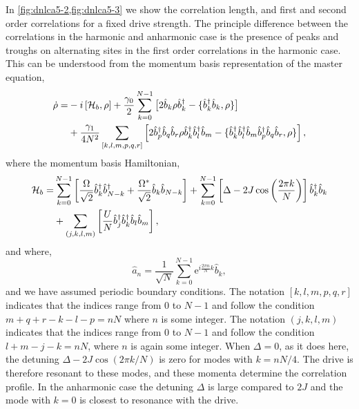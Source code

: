 In \cref{fig:dnlca5-2,fig:dnlca5-3} we show the correlation length, and first and second order correlations for a fixed drive strength. The principle difference between the correlations in the harmonic and anharmonic case is the presence of peaks and troughs on alternating sites in the first order correlations in the harmonic case. This can be understood from the momentum basis representation of the master equation,
\begin{align}
	\dot{\rho} = &-i\left[\mathcal{H}_{b}, \rho\right] + \frac{\gamma_{0}}{2}\sum_{k=0}^{N-1}\big[2\hat{b}_{k}\rho\hat{b}_{k}^{\dagger} - \{\hat{b}_{k}^{\dagger}\hat{b}_{k}, \rho\}\big] \notag \\
	&+ \frac{\gamma_{1}}{4N^{2}} \sum_{[k,l,m,p,q,r]} \left[ 2\hat{b}_{p}^{\dagger}\hat{b}_{q}\hat{b}_{r}\rho\hat{b}_{k}^{\dagger}\hat{b}_{l}^{\dagger}\hat{b}_{m} - \{\hat{b}_{k}^{\dagger}\hat{b}_{l}^{\dagger}\hat{b}_{m}\hat{b}_{p}^{\dagger}\hat{b}_{q}\hat{b}_{r}, \rho\} \right],
	\label{eq:dnlca5-3}
\end{align}
where the momentum basis Hamiltonian,
\begin{align}
	\mathcal{H}_{b} = &\sum_{k=0}^{N-1} \left[ \frac{\Omega}{\sqrt{2}}\hat{b}_{k}^{\dagger}\hat{b}_{N-k}^{\dagger} + \frac{\Omega^{*}}{\sqrt{2}}\hat{b}_{k}\hat{b}_{N-k} \right] + \sum_{k=0}^{N-1} \left[\Delta - 2J\cos\left(\frac{2\pi k}{N}\right)\right]\hat{b}_{k}^{\dagger}\hat{b}_{k} \notag \\
	&+ \sum_{(j,k,l,m)} \left[ \frac{U}{N} \hat{b}_{j}^{\dagger}\hat{b}_{k}^{\dagger}\hat{b}_{l}\hat{b}_{m} \right],
	\label{eq:dnlca5-1}
\end{align}
and where,
\begin{equation}
	\hat{a}_{n} = \frac{1}{\sqrt{N}} \sum_{k=0}^{N-1} \mathrm{e}^{i\frac{2\pi n}{N}k}\hat{b}_{k},
	\label{eq:dnlca5-2}
\end{equation}
and we have assumed periodic boundary conditions. The notation \([k,l,m,p,q,r]\) indicates that the indices range from \(0\) to \(N-1\) and follow the condition \(m+q+r-k-l-p = nN\) where \(n\) is some integer. The notation \((j,k,l,m)\) indicates that the indices range from \(0\) to \(N-1\) and follow the condition \(l+m-j-k = nN\), where \(n\) is again some integer. When \(\Delta = 0\), as it does here, the detuning \(\Delta - 2J\cos (2 \pi k/N)\) is zero for modes with \(k = nN/4\). The drive is therefore resonant to these modes, and these momenta determine the correlation profile. In the anharmonic case the detuning \(\Delta\) is large compared to \(2J\) and the mode with \(k=0\) is closest to resonance with the drive.

